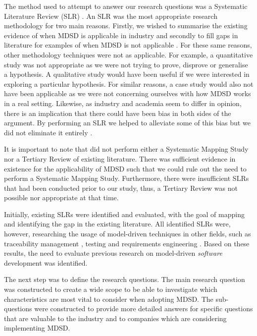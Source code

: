 \documentclass[10pt,twocolumn]{article}
\begin{document}
The method used to attempt to answer our research questions was a Systematic Literature Review (SLR) \cite{kitchenham2007guidelines}. An SLR was the most appropriate research methodology for two main reasons. Firstly, we wished to summarise the existing evidence of when MDSD is applicable in industry and secondly to fill gaps in literature for examples of when MDSD is not applicable \cite{kitchenham2007guidelines}. For these same reasons, other methodology techniques were not as applicable. For example, a quantitative study was not appropriate as we were not trying to prove, disprove or generalise a hypothesis. A qualitative study would have been useful if we were interested in exploring a particular hypothesis. For similar reasons, a case study would also not have been applicable as we were not concerning ourselves with how MDSD works in a real setting. Likewise, as industry and academia seem to differ in opinion, there is an implication that there could have been bias in both sides of the argument. By performing an SLR we helped to alleviate some of this bias but we did not eliminate it entirely \cite{kitchenham2007guidelines}.

It is important to note that did not perform either a Systematic Mapping Study nor a Tertiary Review of \cite{kitchenham2007guidelines} existing literature. There was sufficient evidence in existence for the applicability of MDSD such that we could rule out the need to perform a Systematic Mapping Study. Furthermore, there were insufficient SLRs that had been conducted prior to our study, thus, a Tertiary Review \cite{kitchenham2007guidelines} was not possible nor appropriate at that time.


Initially, existing SLRs were identified and evaluated, with the goal of mapping and identifying the gap in the existing literature. All identified SLRs \cite{santiago2012model} \cite{dias2007survey} \cite{loniewski2010systematic} \cite{nicolas2009generation} were, however, researching the usage of model-driven techniques in other fields, such as traceability management \cite{santiago2012model}, testing \cite{dias2007survey} and requirements engineering \cite{loniewski2010systematic} \cite{nicolas2009generation}. Based on these results, the need to evaluate previous research on model-driven \textit{software} development was identified. 

The next step was to define the research questions. The main research question was constructed to create a wide scope to be able to investigate which characteristics are most vital to consider when adopting MDSD. The sub-questions were constructed to provide more detailed answers for specific questions that are valuable to the industry and to companies which are considering implementing MDSD. 
\end{document}
